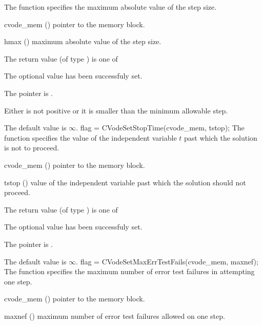 {
  The function  specifies the maximum absolute
  value of the step size.
}
{
  \begin{args}
  \item[cvode\_mem] ()
    pointer to the {\cvode} memory block.
  \item[hmax] ()
    maximum absolute value of the step size.
  \end{args}
}
{
  The return value  (of type ) is one of
  \begin{args}
  \item[\Id{SUCCESS}] 
    The optional value has been successfuly set.
  \item[\Id{CVS\_NO\_MEM}]
    The  pointer is .
  \item[\Id{CVS\_ILL\_INPUT}]
    Either  is not positive or it is smaller than the minimum allowable step.
  \end{args}
}
{
  The default value is $\infty$.
}
{
flag = CVodeSetStopTime(cvode\_mem, tstop);
}
{
  The function  specifies the value of the
  independent variable $t$ past which the solution is not to proceed.
}
{
  \begin{args}
  \item[cvode\_mem] ()
    pointer to the {\cvode} memory block.
  \item[tstop] ()
    value of the independent variable past which the solution should
    not proceed.
  \end{args}
}
{
  The return value  (of type ) is one of
  \begin{args}
  \item[\Id{SUCCESS}] 
    The optional value has been successfuly set.
  \item[\Id{CVS\_NO\_MEM}]
    The  pointer is .
  \end{args}
}
{
  The default value is $\infty$.
}
{
flag = CVodeSetMaxErrTestFails(cvode\_mem, maxnef);
}
{
  The function  specifies the
  maximum number of error test failures in attempting one step.
}
{
  \begin{args}
  \item[cvode\_mem] ()
    pointer to the {\cvode} memory block.
  \item[maxnef] ()
    maximum number of error test failures allowed on one step.
  \end{args}
}

